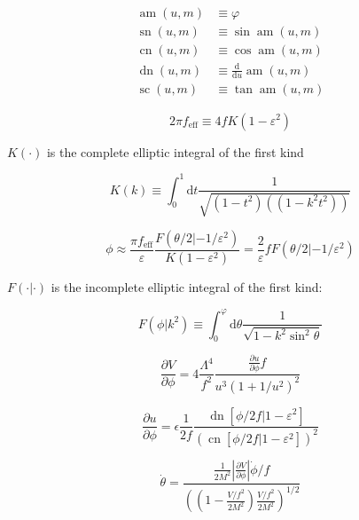 \documentclass[master,       %
               twoside,        %
               BCOR10mm,       %
               english,ngerman, %
               ]{GAUBM}
\begin{document}
\begin{otherlanguage}{english}
\begin{align}
	\operatorname{am}(u, m) &\equiv \varphi \\
	\operatorname{sn}(u, m) &\equiv \sin \operatorname{am}(u, m) \\
	\operatorname{cn}(u, m) &\equiv \cos \operatorname{am}(u, m) \\
	\operatorname{dn}(u, m) &\equiv \frac{\mathrm{d}}{\mathrm{d} u} \operatorname{am}(u, m) \\
	\operatorname{sc}(u, m) &\equiv \tan \operatorname{am}(u, m)
\end{align}


\begin{equation}
	2 \pi f_\mathrm{eff} \equiv 4 f K(1 - \varepsilon^2)
\end{equation}

$K(\cdot)$ is the complete elliptic integral of the first
kind

\begin{equation}
	K(k) \equiv \int_0^1 \mathrm{d}t \frac{1}{\sqrt{(1 - t^2)((1 - k^2t^2))}}
\end{equation}


\begin{equation}
	\phi \approx \frac{\pi f_\mathrm{eff}}{\varepsilon} \frac{F(\theta/2 | - 1 / \varepsilon^2)}{K(1 - \varepsilon^2)} = \frac{2}{\varepsilon} f F(\theta / 2 | - 1 / \varepsilon^2)
\end{equation}

$F( \cdot | \cdot )$ is the incomplete elliptic integral of the first kind:

\begin{equation}
	F(\phi | k^2) \equiv \int_0^\varphi \mathrm{d} \theta \frac{1}{\sqrt{1 - k^2 \sin^2 \theta}} 
\end{equation}

\begin{equation}
	\frac{\partial V}{\partial \phi} = 4 \frac{\Lambda^4}{f^2} \frac{\frac{\partial u}{\partial \phi} f}{u^3(1 + 1/u^2)^2}
\end{equation}

\begin{equation}
	\frac{\partial u}{\partial \phi} = \epsilon \frac{1}{2 f} \frac{\operatorname{dn}[\phi/2f|1 - \varepsilon^2]}{(\operatorname{cn}[\phi/2f|1 - \varepsilon^2])^2}
\end{equation}

\begin{equation}
	\dot{\theta} = \frac{\frac{1}{2M^2} \left| \frac{\partial V}{\partial \phi} \right| \dot{\phi} / f}{\left(\left(1 - \frac{V/f^2}{2M^2}\right) \frac{V / f^2}{2 M^2} \right)^{1/2}}
\end{equation}


\end{otherlanguage}
\end{document}
